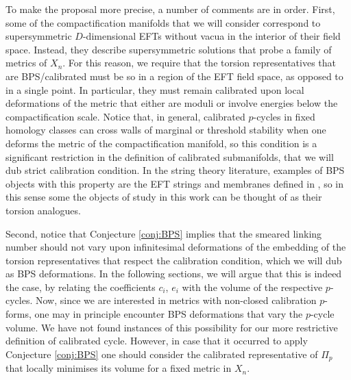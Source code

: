 \documentclass[11pt]{article}
\begin{document}
To make the proposal more precise, a number of comments are in order. First, some of the compactification manifolds that we will consider correspond to supersymmetric $D$-dimensional EFTs without vacua in the interior of their field space. Instead, they describe supersymmetric solutions that probe a family of metrics of $X_n$. For this reason, we require that the torsion representatives that are BPS/calibrated must be so in a region of the EFT field space, as opposed to in a single point. In particular, they must remain calibrated upon local deformations of the metric that either are moduli or involve energies below the compactification scale. Notice that, in general, calibrated $p$-cycles in fixed homology classes can cross walls of marginal or threshold stability when one deforms the metric of the compactification manifold, so this condition is a significant restriction in the definition of calibrated submanifolds, that we will dub strict calibration condition. In the string theory literature, examples of BPS objects with this property are the EFT strings and membranes defined in \cite{Lanza:2020qmt,Lanza:2021udy,Lanza:2022zyg}, so in this sense some the objects of study in this work can be thought of as their torsion analogues. 

Second, notice that Conjecture \ref{conj:BPS} implies that the smeared linking number should not vary upon infinitesimal deformations of the embedding of the torsion representatives that respect the calibration condition, which we will dub as BPS deformations. In the following sections, we will argue that this is indeed the case, by relating the coefficients $c_i$, $e_i$ with the volume of the respective $p$-cycles. Now, since we are interested in metrics with non-closed calibration $p$-forms, one may in principle encounter BPS deformations that vary the $p$-cycle volume. We have not found instances of this possibility for our more restrictive definition of calibrated cycle. However, in case that it occurred to apply Conjecture \ref{conj:BPS} one should consider the calibrated representative of $\Pi_p$ that locally minimises its volume for a fixed metric in $X_n$. 
\end{document}
